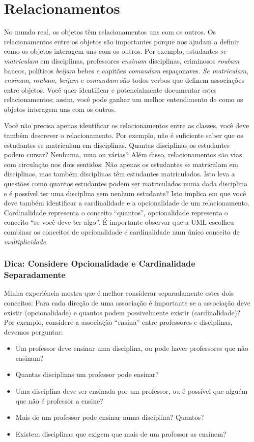 \documentclass[
	article,			%
	12pt,				%
	openright,
	twoside,			%
	a4paper,			%
	english,			%
	french,
	brazil,				%
	sumario=tradicional
	]{abntex2}
\begin{document}
\section{Relacionamentos}

No mundo real, os objetos têm relacionamentos uns com os outros. Os relacionamentos entre os objetos são importantes porque nos ajudam a definir como os objetos interagem uns com os outros. Por exemplo, estudantes \textit{se matriculam} em disciplinas, professores \textit{ensinam} disciplinas, criminosos \textit{roubam} bancos, políticos \textit{beijam} bebes e capitães \textit{comandam} espaçonaves. \textit{Se matriculam}, \textit{ensinam}, \textit{roubam}, \textit{beijam} e \textit{comandam} são todos verbos que definem associações entre objetos. Você quer identificar e potencialmente documentar estes relacionamentos; assim, você pode ganhar um melhor entendimento de como os objetos interagem uns com os outros.

Você não precisa apenas identificar os relacionamentos entre as classes, você deve também descrever o relacionamento. Por exemplo, não é suficiente saber que os estudantes se matriculam em disciplinas. Quantas disciplinas os estudantes podem cursar? Nenhuma, uma ou várias? Além disso, relacionamentos são vias com circulação nos dois sentidos: Não apenas os estudantes se matriculam em disciplinas, mas também disciplinas têm estudantes matriculados. Isto leva a questões como quantos estudantes podem ser matriculados numa dada disciplina e é possível ter uma disciplina sem nenhum estudante? Isto implica em que você deve também identificar a cardinalidade e a opcionalidade de um relacionamento. Cardinalidade representa o conceito ``quantos'', opcionalidade representa o conceito ``se você deve ter algo''. É importante observar que a UML escolheu combinar os conceitos de opcionalidade e cardinalidade num único conceito de \emph{multiplicidade}.

\subsubsection{Dica: Considere Opcionalidade e Cardinalidade Separadamente}

Minha experiência mostra que é melhor considerar separadamente estes dois conceitos: Para cada direção de uma associação é importante se a associação deve existir (opcionalidade) e quantos podem possivelmente existir (cardinalidade)? Por exemplo, considere a associação ``ensina'' entre professores e disciplinas, devemos perguntar:
\begin{itemize}
\item Um professor deve ensinar uma disciplina, ou pode haver professores que não ensinam?
\item Quantas disciplinas um professor pode ensinar?
\item Uma disciplina deve ser ensinada por um professor, ou é possível que alguém que não é professor a ensine?
\item Mais de um professor pode ensinar numa disciplina? Quantos?
\item Existem disciplinas que exigem que mais de um professor as ensinem?
\end{itemize}
\end{document}
